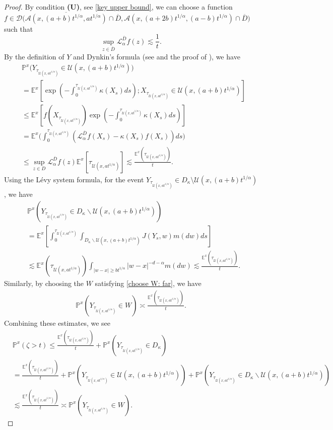 \documentclass[12pt,a4paper]{amsart}
\numberwithin{equation}{section}
\theoremstyle{plain}
\newcommand{\mc}{\mathcal}
\newcommand{\mb}{\mathbb}
\newcommand{\1}{\mathbbm{1}}
\begin{document}
\begin{proof}
By condition {\bf (U)}, see \eqref{key upper bound}, we can choose a function 
$f \in \mc D\big(\overline{\mc A(x, (a+b)t^{1/\alpha}, a t^{1/\alpha})}\cap \overline{D}, \mc A(x,(a+2b)t^{1/\alpha}, (a-b)t^{1/\alpha})\cap\overline{D}\big)$ 
such that 
\begin{equation}
\sup_{z \in \overline{D}} 
\mc L^{\overline{D}}_\alpha f(z) \lesssim \frac{1}{t}.
\end{equation}
By the definition of $Y$ and Dynkin's formula (see \cite[(2.11)]{Bogdan15} and the proof of \cite[(4.6)]{Bogdan15}), we have
\begin{align*}
& \mb P^x\big(Y_{\tau_{\mc U(x,at^{1/\alpha})}} \in \mc U(x,(a+b)t^{1/\alpha})\big) \\
&=\mb E^x\left[\exp\left(-\int^{\tau_{\mc U(x,at^{1/\alpha})}}_0
\kappa(X_s)ds\right) ; 
X_{\tau_{\mc U(x,at^{1/\alpha})}} \in \mc U(x,(a+b)t^{1/\alpha})\right]\\
& \le \mb E^x\left[f(X_{\tau_{\mc U(x,at^{1/\alpha})}})\exp\left(-\int^{\tau_{\mc U(x,at^{1/\alpha})}}_0
\kappa(X_s)ds\right)\right]\\
&= \mb E^x\bigg(\int_0^{\tau_{\mc U(x,at^{1/\alpha})}}(
\mc L^{\overline{D}}_\alpha  f(X_s) 
- \kappa(X_s)f(X_s))ds\bigg) \\
& \le \sup_{z\in D} 
\mc L^{\overline{D}}_\alpha f(z)
\mb E^x[\tau_{\mc U(x,at^{1/\alpha})}] \lesssim \frac{\mb E^x(\tau_{\mc U(x,at^{1/\alpha})})}{t}.
\end{align*}
Using the L\'evy system formula, for the event 
$Y_{\tau_{\mc U(x,at^{1/\alpha})}} \in D_\kappa \setminus \mc U(x,(a+b)t^{1/\alpha})$, 
we have 
\begin{align*}
& \mb P^x(Y_{\tau_{\mc U(x,at^{1/\alpha})}} \in 
D_\kappa \backslash \mc U(x,(a+b)t^{1/\alpha})) \\
&=\mb E^x \left[\int_0^{\tau_{\mc U(x,at^{1/\alpha})}} 
\int_{D_\kappa \backslash \mc U(x,(a+b)t^{1/\alpha})}J(Y_s,w)m(dw)ds\right] \\
& \lesssim \mb E^x(\tau_{\mc U(x,at^{1/\alpha})})\int_{|w-x|\ge b t^{1/\alpha}}|w-x|^{-d-\alpha}m(dw) \lesssim \frac{\mb E^x(\tau_{\mc U(x,at^{1/\alpha})})}{t}.
\end{align*}
Similarly, by choosing the $W$ satisfying \eqref{choose W: far}, we have 
\begin{align*}
\mb P^x(Y_{\tau_{\mc U(x,at^{1/\alpha})}} \in W) \asymp \frac{\mb E^x(\tau_{\mc U(x,at^{1/\alpha})})}{t}.
\end{align*}
Combining these estimates, we see
\begin{align*}
& \mb{P}^x(\zeta > t) \le \frac{\mb E^x(\tau_{\mc U(x,at^{1/\alpha})})}{t} + 
\mb{P}^x(Y_{\tau_{\mc U(x,at^{1/\alpha})}} \in D_\kappa) \\
&= \frac{\mb E^x(\tau_{\mc U(x,at^{1/\alpha})})}{t} + \mb P^x(Y_{\tau_{\mc U(x,at^{1/\alpha})}} \in \mc U(x,(a+b)t^{1/\alpha})) 
+ \mb P^x(Y_{\tau_{\mc U(x,at^{1/\alpha})}} \in D_\kappa \backslash \mc U(x,(a+b)t^{1/\alpha})) \\
& \lesssim \frac{\mb E^x(\tau_{\mc U(x,at^{1/\alpha})})}{t} \asymp \mb P^x(Y_{\tau_{\mc U(x,at^{1/\alpha})}} \in W).
\end{align*}


\end{proof}
\end{document}
